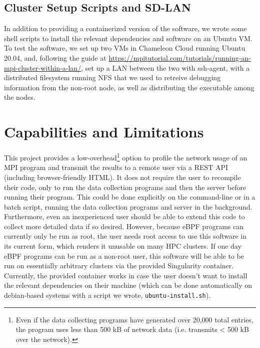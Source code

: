 \documentclass[11pt]{article}
\begin{document}
\subsection*{Cluster Setup Scripts and SD-LAN}
In addition to providing a containerized version of the software, we wrote some shell scripts to install the relevant dependencies and software on an Ubuntu VM. To test the software, we set up two VMs in Chameleon Cloud running Ubuntu 20.04, and, following the guide at \url{https://mpitutorial.com/tutorials/running-an-mpi-cluster-within-a-lan/}, set up a LAN between the two with ssh-agent, with a distributed filesystem running NFS that we used to retreive debugging information from the non-root node, as well as distributing the executable among the nodes.

\section{Capabilities and Limitations}

This project provides a low-overhead\footnote{Even if the data collecting programs have generated over 20,000 total entries, the program uses less than 500 kB of network data (i.e. transmits < 500 kB over the network).} option to profile the network usage of an MPI program and transmit the results to a remote user via a REST API (including browser-friendly HTML). It does not require the user to recompile their code, only to run the data collection programs and then the server before running their program. This could be done explicitly on the command-line or in a batch script, running the data collection programs and server in the background. Furthermore, even an inexperienced user should be able to extend this code to collect more detailed data if so desired. However, because eBPF programs can currently only be run as root, the user needs root access to use this software in its current form, which renders it unusable on many HPC clusters. If one day eBPF programs can be run as a non-root user, this software will be able to be run on essentially arbitrary clusters via the provided Singularity container. Currently, the provided container works in case the user doesn't want to install the relevant dependencies on their machine (which can be done automatically on debian-based systems with a script we wrote, \lstinline{ubuntu-install.sh}). 
\end{document}
